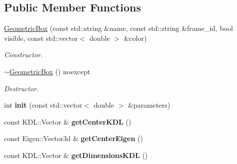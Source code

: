 \subsection*{Public Member Functions}
\begin{DoxyCompactItemize}
\item 
\hypertarget{classhiqp_1_1GeometricBox_a78ce72281a8f0a1029e68ef82640f412}{\hyperlink{classhiqp_1_1GeometricBox_a78ce72281a8f0a1029e68ef82640f412}{Geometric\-Box} (const std\-::string \&name, const std\-::string \&frame\-\_\-id, bool visible, const std\-::vector$<$ double $>$ \&color)}\label{classhiqp_1_1GeometricBox_a78ce72281a8f0a1029e68ef82640f412}

\begin{DoxyCompactList}\small\item\em Constructor. \end{DoxyCompactList}\item 
\hypertarget{classhiqp_1_1GeometricBox_a1cb1d08bffbe32f88ba8254b9eb4518b}{\hyperlink{classhiqp_1_1GeometricBox_a1cb1d08bffbe32f88ba8254b9eb4518b}{$\sim$\-Geometric\-Box} () noexcept}\label{classhiqp_1_1GeometricBox_a1cb1d08bffbe32f88ba8254b9eb4518b}

\begin{DoxyCompactList}\small\item\em Destructor. \end{DoxyCompactList}\item 
\hypertarget{classhiqp_1_1GeometricBox_a3b1d89d6b522b544db8f8f7c9c13a46d}{int {\bfseries init} (const std\-::vector$<$ double $>$ \&parameters)}\label{classhiqp_1_1GeometricBox_a3b1d89d6b522b544db8f8f7c9c13a46d}

\item 
\hypertarget{classhiqp_1_1GeometricBox_a5e8a17512401c6700d4a3db20f8dc769}{const K\-D\-L\-::\-Vector \& {\bfseries get\-Center\-K\-D\-L} ()}\label{classhiqp_1_1GeometricBox_a5e8a17512401c6700d4a3db20f8dc769}

\item 
\hypertarget{classhiqp_1_1GeometricBox_a159e0d9044560a98fc1f1021dbb3d7af}{const Eigen\-::\-Vector3d \& {\bfseries get\-Center\-Eigen} ()}\label{classhiqp_1_1GeometricBox_a159e0d9044560a98fc1f1021dbb3d7af}

\item 
\hypertarget{classhiqp_1_1GeometricBox_a0a6431ebcee06f30469537aae0f4a7d2}{const K\-D\-L\-::\-Vector \& {\bfseries get\-Dimensions\-K\-D\-L} ()}\label{classhiqp_1_1GeometricBox_a0a6431ebcee06f30469537aae0f4a7d2}


\end{DoxyCompactItemize}
